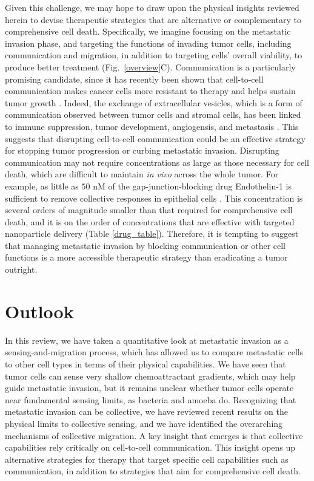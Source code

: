 Given this challenge, we may hope to draw upon the physical insights reviewed herein to devise therapeutic strategies that are alternative or complementary to comprehensive cell death. Specifically, we imagine focusing on the metastatic invasion phase, and targeting the functions of invading tumor cells, including communication and migration, in addition to targeting cells' overall viability, to produce better treatment (Fig.\ \ref{overview}C). Communication is a particularly promising candidate, since it has recently been shown that cell-to-cell communication makes cancer cells more resistant to therapy and helps sustain tumor growth \cite{boelens2014exosome}. Indeed, the exchange of extracellular vesicles, which is a form of communication observed between tumor cells and stromal cells, has been linked to immune suppression, tumor development, angiogensis, and metastasis \cite{vader2014extracellular}. This suggests that disrupting cell-to-cell communication could be an effective strategy for stopping tumor progression or curbing metastatic invasion. Disrupting communication may not require concentrations as large as those necessary for cell death, which are difficult to maintain \textit{in vivo} across the whole tumor. For example, as little as $50$ nM of the gap-junction-blocking drug Endothelin-1 is sufficient to remove collective responses in epithelial cells \cite{ellison2016cell}. This concentration is several orders of magnitude smaller than that required for comprehensive cell death, and it is on the order of concentrations that are effective with targeted nanoparticle delivery (Table \ref{drug_table}). Therefore, it is tempting to suggest that managing metastatic invasion by blocking communication or other cell functions is a more accessible therapeutic strategy than eradicating a tumor outright.


\section{Outlook}

In this review, we have taken a quantitative look at metastatic invasion as a sensing-and-migration process, which has allowed us to compare metastatic cells to other cell types in terms of their physical capabilities. We have seen that tumor cells can sense very shallow chemoattractant gradients, which may help guide metastatic invasion, but it remains unclear whether tumor cells  operate near fundamental sensing limits, as bacteria and amoeba do. Recognizing that metastatic invasion can be collective, we have reviewed recent results on the physical limits to collective sensing, and we have identified the overarching mechanisms of collective migration. A key insight that emerges is that collective capabilities rely critically on cell-to-cell communication. This insight opens up alternative strategies for therapy that target specific cell capabilities such as communication, in addition to strategies that aim for comprehensive cell death.

